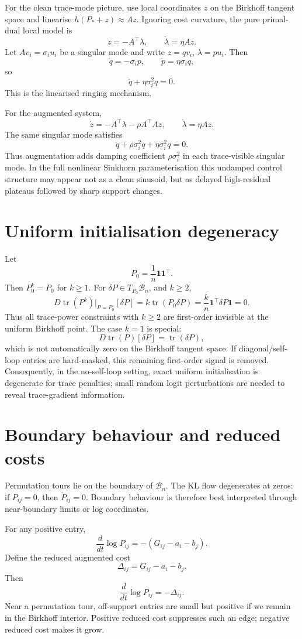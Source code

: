 \documentclass[11pt]{article}
\newcommand{\B}{\mathcal B}
\newcommand{\one}{\mathbf 1}
\newcommand{\tr}{\operatorname{tr}}
\begin{document}
For the clean trace-mode picture, use local coordinates $z$ on the Birkhoff tangent space and linearise $h(P_*+z)\approx Az$. Ignoring cost curvature, the pure primal-dual local model is
\[
    \dot z=-A^\top\lambda,
    \qquad
    \dot\lambda=\eta A z.
\]
Let $Av_i=\sigma_i u_i$ be a singular mode and write $z=qv_i$, $\lambda=pu_i$. Then
\[
    \dot q=-\sigma_i p,
    \qquad
    \dot p=\eta\sigma_i q,
\]
so
\[
    \ddot q+\eta\sigma_i^2q=0.
\]
This is the linearised ringing mechanism.

For the augmented system,
\[
    \dot z=-A^\top\lambda-\rho A^\top A z,
    \qquad
    \dot\lambda=\eta A z.
\]
The same singular mode satisfies
\[
    \ddot q+\rho\sigma_i^2\dot q+\eta\sigma_i^2q=0.
\]
Thus augmentation adds damping coefficient $\rho\sigma_i^2$ in each trace-visible singular mode. In the full nonlinear Sinkhorn parameterisation this undamped control structure may appear not as a clean sinusoid, but as delayed high-residual plateaus followed by sharp support changes.

\section{Uniform initialisation degeneracy}

Let
\[
    P_0=\frac{1}{n}\one\one^\top.
\]
Then $P_0^k=P_0$ for $k\ge1$. For $\delta P\in T_{P_0}\B_n$, and $k\ge2$,
\[
D\tr(P^k)|_{P=P_0}[\delta P]
=k\tr(P_0\delta P)
=\frac{k}{n}\one^\top\delta P\one=0.
\]
Thus all trace-power constraints with $k\ge2$ are first-order invisible at the uniform Birkhoff point. The case $k=1$ is special:
\[
    D\tr(P)[\delta P]=\tr(\delta P),
\]
which is not automatically zero on the Birkhoff tangent space. If diagonal/self-loop entries are hard-masked, this remaining first-order signal is removed. Consequently, in the no-self-loop setting, exact uniform initialisation is degenerate for trace penalties; small random logit perturbations are needed to reveal trace-gradient information.

\section{Boundary behaviour and reduced costs}

Permutation tours lie on the boundary of $\B_n$. The KL flow degenerates at zeros: if $P_{ij}=0$, then $\dot P_{ij}=0$. Boundary behaviour is therefore best interpreted through near-boundary limits or log coordinates.

For any positive entry,
\[
    \frac{d}{dt}\log P_{ij}=-(G_{ij}-a_i-b_j).
\]
Define the reduced augmented cost
\[
    \Delta_{ij}=G_{ij}-a_i-b_j.
\]
Then
\[
    \frac{d}{dt}\log P_{ij}=-\Delta_{ij}.
\]
Near a permutation tour, off-support entries are small but positive if we remain in the Birkhoff interior. Positive reduced cost suppresses such an edge; negative reduced cost makes it grow.
\end{document}
